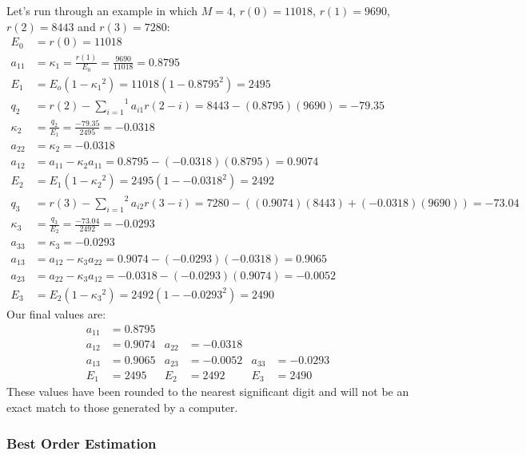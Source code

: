 Let's run through an example in which $M = 4$, $r(0) = 11018$, $r(1) = 9690$,
$r(2) = 8443$ and $r(3) = 7280$:
{
\begin{align*}
E_0 &= r(0) = 11018 \\
a_{11} &= \kappa_1 = \frac{r(1)}{E_0} = \frac{9690}{11018} = 0.8795 \\
E_1 &= E_o(1 - {\kappa_1} ^ 2) = 11018(1 - 0.8795 ^ 2) = 2495 \\
q_2 &= r(2) - \overset{1}{\underset{i = 1}{\sum}} a_{i1}r(2 - i) = 8443 - (0.8795)(9690) = -79.35 \\
\kappa_2 &= \frac{q_2}{E_1} = \frac{-79.35}{2495} = -0.0318 \\
a_{22} &= \kappa_2 = -0.0318 \\
a_{12} &= a_{11} - \kappa_2 a_{11} = 0.8795 - (-0.0318)(0.8795) = 0.9074 \\
E_2 &= E_1 (1 - {\kappa_2} ^ 2 ) = 2495(1 - {-0.0318 ^ 2}) = 2492 \\
q_3 &= r(3) - \overset{2}{\underset{i = 1}{\sum}} a_{i2} r(3 - i) = 7280 - ((0.9074)(8443) + (-0.0318)(9690)) = -73.04 \\
\kappa_3 &= \frac{q_3}{E_2} = \frac{-73.04}{2492} = -0.0293 \\
a_{33} &= \kappa_3 = -0.0293 \\
a_{13} &= a_{12} - \kappa_3 a_{22} = 0.9074 - (-0.0293)(-0.0318) = 0.9065 \\
a_{23} &= a_{22} - \kappa_3 a_{12} = -0.0318 - (-0.0293)(0.9074) = -0.0052 \\
E_3 &= E_2 (1 - {\kappa_3} ^ 2 ) = 2492(1 - {-0.0293 ^ 2}) = 2490
\end{align*}
}
Our final values are:
{
\begin{align*}
a_{11} &= 0.8795 & & & & \\
a_{12} &= 0.9074 & a_{22} &= -0.0318 & & \\
a_{13} &= 0.9065 & a_{23} &= -0.0052 & a_{33} &= -0.0293 \\
E_1 &= 2495 & E_2 &= 2492 & E_3 &= 2490
\end{align*}
}
\noindent
These values have been rounded to the nearest significant digit
and will not be an exact match to those generated by a computer.

\pagebreak

\subsubsection{Best Order Estimation}

